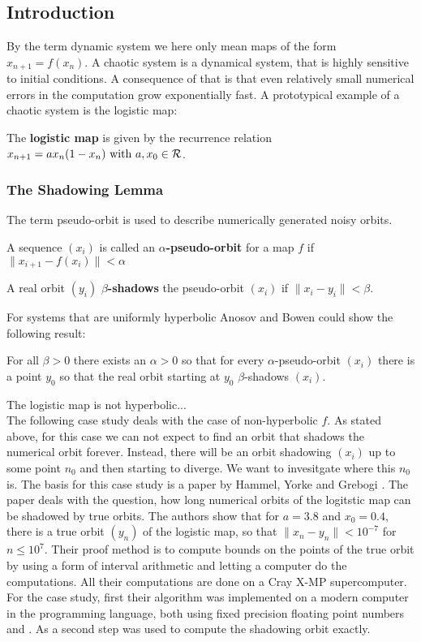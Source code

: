   \subsection{Introduction}
  By the term dynamic system we here only mean maps of the form $x_{n+1} = f(x_n)$.
  A chaotic system is a dynamical system, that is highly sensitive to initial conditions.
  A consequence of that is that even relatively small numerical errors in the computation grow exponentially fast.
  A prototypical example of a chaotic system is the logistic map:
  \begin{definition}\label{def:logmap}
  The \textbf{logistic map} is given by the recurrence relation 
  $ x_{n+1} = ax_n(1-x_n) \text{ with } a, x_0 \in \mathcal R$.
  \end{definition} 

 \subsubsection{The Shadowing Lemma}
 The term pseudo-orbit is used to describe numerically generated noisy orbits. 
 \begin{definition}\label{def:pseudoorbit}
 A sequence $(x_i)$ is called an \textbf{$\alpha$-pseudo-orbit} for a map $f$ if
 $ \| x_{i+1} - f(x_i) \| < \alpha $  
 \end{definition}

  \begin{definition}\label{def:shadowing}
	A real orbit $(y_i)$ \textbf{$\beta$-shadows} the pseudo-orbit $(x_i)$ if 
	$\| x_i - y_i \| < \beta$.  
 \end{definition}
  For systems that are uniformly hyperbolic Anosov and Bowen could show the following result:
  \begin{theorem}
  For all $\beta > 0$ there exists an $\alpha > 0$ so that for every $\alpha$-pseudo-orbit $(x_i)$ there is a point $y_0$ so that the real orbit starting at $y_0$ $\beta$-shadows $(x_i)$.
  \end{theorem} 
  The logistic map is not hyperbolic...\\
  The following case study deals with the case of non-hyperbolic $f$. 
  As stated above, for this case we can not expect to find an orbit that shadows the numerical orbit forever. 
  Instead, there will be an orbit shadowing $(x_i)$ up to some point $n_0$ and then starting to diverge. 
  We want to invesitgate where this $n_0$ is.
  The basis for this case study is a paper by Hammel, Yorke and Grebogi  \cite{Hammel1987}. 
  The paper deals with the question, how long numerical orbits of the logitstic map can be shadowed by true orbits.
  The authors show that for $a = 3.8$ and $x_0 = 0.4$, there is a true orbit $(y_n)$ of the logistic map, so that $\| x_n - y_n \| < 10^{-7}$ for $n \leq 10^7$.
  Their proof method is to compute bounds on the points of the true orbit by using a form of interval arithmetic and letting a computer do the computations. 
  All their computations are done on a Cray X-MP supercomputer. 
  For the case study, first their algorithm was implemented on a modern computer in the \cc programming language, both using fixed precision floating point numbers and \irram. 
  As a second step \irram was used to compute the shadowing orbit exactly.

